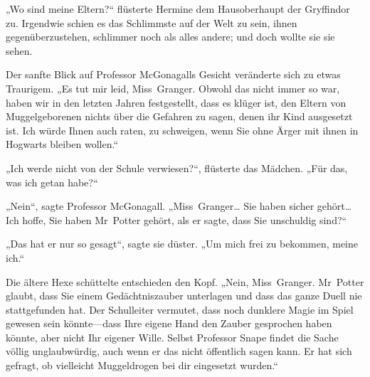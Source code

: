 „Wo sind meine Eltern?“ flüsterte Hermine dem Hausoberhaupt der Gryffindor zu. Irgendwie schien es das Schlimmste auf der Welt zu sein, ihnen gegenüberzustehen, schlimmer noch als alles andere; und doch wollte sie sie sehen.

Der sanfte Blick auf Professor McGonagalls Gesicht veränderte sich zu etwas Traurigem. „Es tut mir leid, Miss~Granger. Obwohl das nicht immer so war, haben wir in den letzten Jahren festgestellt, dass es klüger ist, den Eltern von Muggelgeborenen nichts über die Gefahren zu sagen, denen ihr Kind ausgesetzt ist. Ich würde Ihnen auch raten, zu schweigen, wenn Sie ohne Ärger mit ihnen in Hogwarts bleiben wollen.“

„Ich werde nicht von der Schule verwiesen?“, flüsterte das Mädchen. „Für das, was ich getan habe?“

„Nein“, sagte Professor McGonagall. „Miss~Granger… Sie haben sicher gehört… Ich hoffe, Sie haben Mr~Potter gehört, als er sagte, dass Sie unschuldig sind?“

„Das hat er nur so gesagt“, sagte sie düster. „Um mich frei zu bekommen, meine ich.“

Die ältere Hexe schüttelte entschieden den Kopf. „Nein, Miss~Granger. Mr~Potter glaubt, dass Sie einem Gedächtniszauber unterlagen und dass das ganze Duell nie stattgefunden hat. Der Schulleiter vermutet, dass noch dunklere Magie im Spiel gewesen sein könnte—dass Ihre eigene Hand den Zauber gesprochen haben könnte, aber nicht Ihr eigener Wille. Selbst Professor Snape findet die Sache völlig unglaubwürdig, auch wenn er das nicht öffentlich sagen kann. Er hat sich gefragt, ob vielleicht Muggeldrogen bei dir eingesetzt wurden.“

